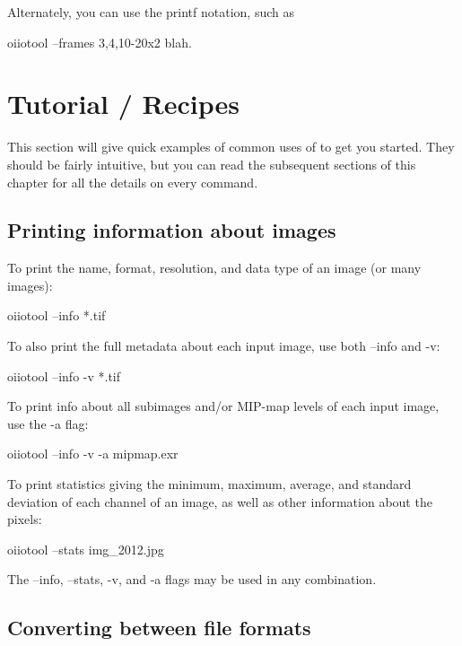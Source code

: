 Alternately, you can use the {\cf printf} notation, such as
\begin{code}
    oiiotool --frames 3,4,10-20x2 blah.%
\end{code}


\section{\oiiotool Tutorial / Recipes}

This section will give quick examples of common uses of \oiiotool to get
you started.  They should be fairly intuitive, but you can read the
subsequent sections of this chapter for all the details on every
command.

\subsection*{Printing information about images}

To print the name, format, resolution, and data type of an image
(or many images):

\begin{code}
    oiiotool --info *.tif
\end{code}

\noindent To also print the full metadata about each input image, use both
{\cf --info} and {\cf -v}:

\begin{code}
    oiiotool --info -v *.tif
\end{code}

\noindent To print info about all subimages and/or MIP-map levels of each
input image, use the {\cf -a} flag:

\begin{code}
    oiiotool --info -v -a mipmap.exr
\end{code}

\noindent To print statistics giving the minimum, maximum, average, and
standard deviation of each channel of an image, as well as other
information about the pixels:

\begin{code}
    oiiotool --stats img_2012.jpg
\end{code}

\noindent The {\cf --info}, {\cf --stats}, {\cf -v}, and {\cf -a} flags may
be used in any combination.


\subsection*{Converting between file formats}

